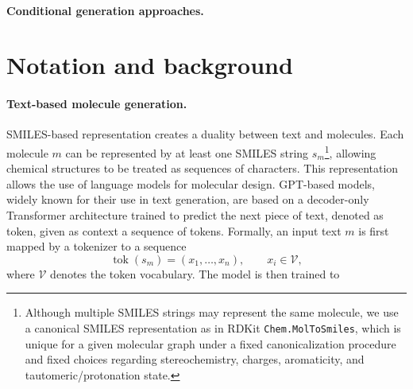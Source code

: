 \documentclass[10pt]{article} %
\begin{document}
\paragraph{Conditional generation approaches.}







\section{Notation and background}
\paragraph{Text-based molecule generation.}
SMILES-based representation creates a duality between text and molecules. Each molecule $m$ can be represented by at least one SMILES string $s_m$\footnote{Although multiple SMILES strings may represent the same molecule, we use a canonical SMILES representation as in RDKit \texttt{Chem.MolToSmiles}, which is unique for a given molecular graph under a fixed canonicalization procedure and fixed choices regarding stereochemistry, charges, aromaticity, and tautomeric/protonation state.}, allowing chemical structures to be treated as sequences of characters.
This representation allows the use of language models for molecular design.
GPT-based models, widely known for their use in text generation, are based on a decoder-only Transformer architecture trained to predict the next piece of text, denoted as token, given as context a sequence of tokens. Formally, an input text \(m\) is first mapped by a tokenizer to a sequence
\[
      \operatorname{tok}(s_m) = (x_1,\ldots,x_n), \qquad x_i \in \mathcal{V},
\]
where \(\mathcal{V}\) denotes the token vocabulary. The model is then trained to
\end{document}
